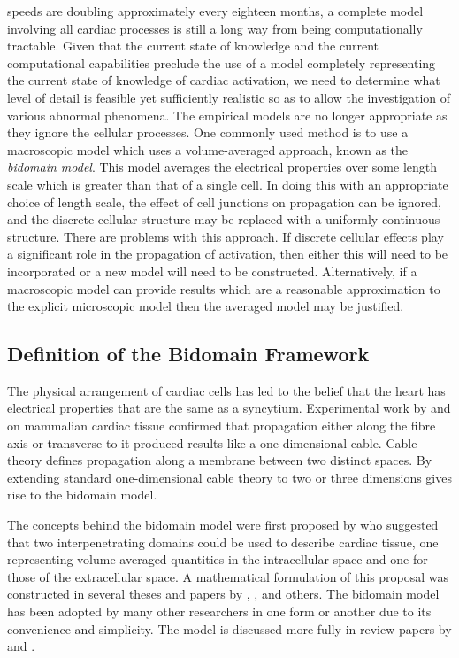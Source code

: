 speeds are doubling approximately every eighteen months, a complete
model involving all cardiac processes is still a long way from being
computationally tractable.  Given that the current state of knowledge
and the current computational capabilities preclude the use of a model
completely representing the current state of knowledge of cardiac
activation, we need to determine what level of detail is feasible yet
sufficiently realistic so as to allow the investigation of various
abnormal phenomena.  The empirical models are no longer appropriate as
they ignore the cellular processes.  One commonly used method is to
use a macroscopic model which uses a volume-averaged approach, known
as the \emph{bidomain model}.  This model averages the electrical
properties over some length scale which is greater than that of a
single cell.  In doing this with an appropriate choice of length
scale, the effect of cell junctions on propagation can be ignored, and
the discrete cellular structure may be replaced with a uniformly
continuous structure.  There are problems with this approach.  If
discrete cellular effects play a significant role in the propagation
of activation, then either this will need to be incorporated or a new
model will need to be constructed.  Alternatively, if a macroscopic
model can provide results which are a reasonable approximation to the
explicit microscopic model then the averaged model may be justified.

\subsection{Definition of the Bidomain Framework}

The physical arrangement of cardiac cells has led to the belief that the heart
has electrical properties that are the same as a syncytium.  Experimental work
by \citet{weidmann:1970} and \citet{clerc:1976} on mammalian cardiac
tissue confirmed that propagation either along the fibre axis or transverse to
it produced results like a one-dimensional cable.  Cable theory defines
propagation along a membrane between two distinct spaces.  By extending
standard one-dimensional cable theory to two or three dimensions gives rise to
the bidomain model.

The concepts behind the bidomain model were first proposed by
\citet{schmitt:1969} who suggested that two interpenetrating domains could
be used to describe cardiac tissue, one representing volume-averaged
quantities in the intracellular space and one for those of the extracellular
space.  A mathematical formulation of this proposal was constructed in several
theses and papers by \citet{tung:1978}, \citet{plonsey:1984},
\citet{miller:1978a} and others.  The bidomain model has been adopted by
many other researchers in one form or another due to its convenience and
simplicity.  The model is discussed more fully in review papers by
\citet{henriquez:1993} and \citet{plonsey:1987}.  

